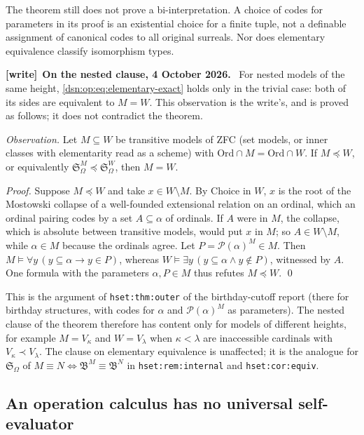 \documentclass[11pt,a4paper]{article}
\numberwithin{equation}{section}
\theoremstyle{definition}
\theoremstyle{remark}
\newcommand{\Ord}{\mathrm{Ord}}
\newcommand{\lbl}[1]{\nolinkurl{#1}}
\newenvironment{writenote}[1][]{\par\medskip\begingroup\small\noindent\textbf{[write]}\if\relax\detokenize{#1}\relax\else~\textbf{#1.}\fi~\ignorespaces}{\par\endgroup\medskip}
\newcommand{\Somega}{\mathfrak S_\Omega}
\begin{document}
The theorem still does not prove a bi-interpretation.  A choice of codes
for parameters in its proof is an existential choice for a finite
tuple, not a definable assignment of canonical codes to all original
surreals.  Nor does elementary equivalence classify isomorphism types.
\begin{writenote}[On the nested clause, 4 October 2026]
For nested models of the same height, \eqref{dsn:op:eq:elementary-exact} holds
only in the trivial case: both of its sides are equivalent to $M=W$. This
observation is the write's, and is proved as follows; it does not contradict
the theorem.

\emph{Observation.} Let $M\subseteq W$ be transitive models of ZFC (set models,
or inner classes with elementarity read as a scheme) with
$\Ord\cap M=\Ord\cap W$. If $M\preccurlyeq W$, or equivalently
$\Somega^M\preccurlyeq\Somega^W$, then $M=W$.

\emph{Proof.} Suppose $M\preccurlyeq W$ and take $x\in W\setminus M$. By Choice
in $W$, $x$ is the root of the Mostowski collapse of a well-founded extensional
relation on an ordinal, which an ordinal pairing codes by a set $A\subseteq\alpha$
of ordinals. If $A$ were in $M$, the collapse, which is absolute between
transitive models, would put $x$ in $M$; so $A\in W\setminus M$, while
$\alpha\in M$ because the ordinals agree. Let $P=\mathcal P(\alpha)^M\in M$.
Then $M\models\forall y\,(y\subseteq\alpha\rightarrow y\in P)$, whereas
$W\models\exists y\,(y\subseteq\alpha\wedge y\notin P)$, witnessed by $A$. One
formula with the parameters $\alpha,P\in M$ thus refutes $M\preccurlyeq W$.
\qed

This is the argument of \lbl{hset:thm:outer} of the birthday-cutoff report
(there for birthday structures, with codes for $\alpha$ and
$\mathcal P(\alpha)^M$ as parameters). The nested clause of the theorem
therefore has content only for models of different heights, for example
$M=V_\kappa$ and $W=V_\lambda$ when $\kappa<\lambda$ are inaccessible cardinals
with $V_\kappa\prec V_\lambda$. The clause on elementary equivalence is
unaffected; it is the analogue for $\Somega$ of
$M\equiv N\iff\mathfrak B^M\equiv\mathfrak B^N$ in \lbl{hset:rem:internal}
and \lbl{hset:cor:equiv}.
\end{writenote}


\subsection{An operation calculus has no universal self-evaluator}
\end{document}
